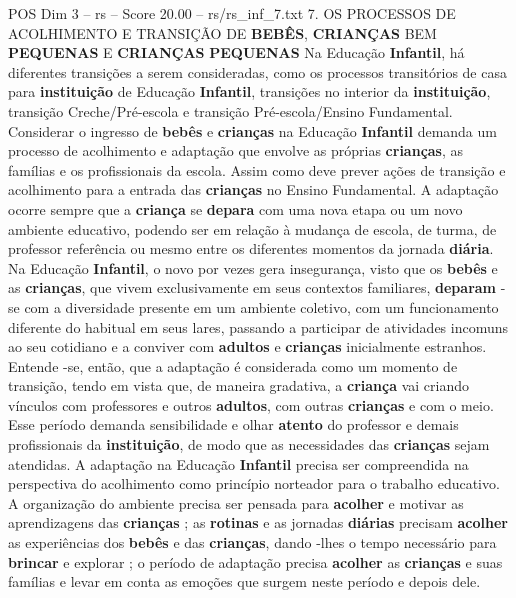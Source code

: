 \begin{textsample}{POS Dim 3 – rs – Score 20.00 – rs/rs\_inf\_7.txt}  \label{ex:f3_pos_245}
7.
OS PROCESSOS DE ACOLHIMENTO E TRANSIÇÃO DE \textbf{BEBÊS}, \textbf{CRIANÇAS} BEM \textbf{PEQUENAS} E \textbf{CRIANÇAS} \textbf{PEQUENAS} Na Educação \textbf{Infantil}, há diferentes transições a serem consideradas, como os processos transitórios de casa para \textbf{instituição} de Educação \textbf{Infantil}, transições no interior da \textbf{instituição}, transição Creche/Pré-escola e transição Pré-escola/Ensino Fundamental.
Considerar o ingresso de \textbf{bebês} e \textbf{crianças} na Educação \textbf{Infantil} demanda um processo de acolhimento e adaptação que envolve as próprias \textbf{crianças}, as famílias e os profissionais da escola.
Assim como deve prever ações de transição e acolhimento para a entrada das \textbf{crianças} no Ensino Fundamental.
A adaptação ocorre sempre que a \textbf{criança} se \textbf{depara} com uma nova etapa ou um novo ambiente educativo, podendo ser em relação à mudança de escola, de turma, de professor referência ou mesmo entre os diferentes momentos da jornada \textbf{diária}.
Na Educação \textbf{Infantil}, o novo por vezes gera insegurança, visto que os \textbf{bebês} e as \textbf{crianças}, que vivem exclusivamente em seus contextos familiares, \textbf{deparam} -se com a diversidade presente em um ambiente coletivo, com um funcionamento diferente do habitual em seus lares, passando a participar de atividades incomuns ao seu cotidiano e a conviver com \textbf{adultos} e \textbf{crianças} inicialmente estranhos.
Entende -se, então, que a adaptação é considerada como um momento de transição, tendo em vista que, de maneira gradativa, a \textbf{criança} vai criando vínculos com professores e outros \textbf{adultos}, com outras \textbf{crianças} e com o meio.
Esse período demanda sensibilidade e olhar \textbf{atento} do professor e demais profissionais da \textbf{instituição}, de modo que as necessidades das \textbf{crianças} sejam atendidas.
A adaptação na Educação \textbf{Infantil} precisa ser compreendida na perspectiva do acolhimento como princípio norteador para o trabalho educativo.
A organização do ambiente precisa ser pensada para \textbf{acolher} e motivar as aprendizagens das \textbf{crianças} ; as \textbf{rotinas} e as jornadas \textbf{diárias} precisam \textbf{acolher} as experiências dos \textbf{bebês} e das \textbf{crianças}, dando -lhes o tempo necessário para \textbf{brincar} e explorar ; o período de adaptação precisa \textbf{acolher} as \textbf{crianças} e suas famílias e levar em conta as emoções que surgem neste período e depois dele.

\end{textsample}
